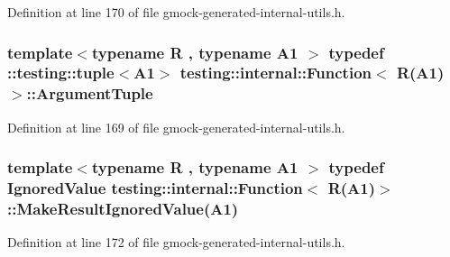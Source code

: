 Definition at line 170 of file gmock-\/generated-\/internal-\/utils.\+h.

\subsubsection[{\texorpdfstring{Argument\+Tuple}{ArgumentTuple}}]{\setlength{\rightskip}{0pt plus 5cm}template$<$typename R , typename A1 $>$ typedef \+::testing\+::tuple$<$A1$>$ {\bf testing\+::internal\+::\+Function}$<$ {\bf R}(A1)$>$\+::{\bf Argument\+Tuple}}\hypertarget{structtesting_1_1internal_1_1_function_3_01_r_07_a1_08_4_afd48881a58d72658e547a170fb0f2087}{}\label{structtesting_1_1internal_1_1_function_3_01_r_07_a1_08_4_afd48881a58d72658e547a170fb0f2087}


Definition at line 169 of file gmock-\/generated-\/internal-\/utils.\+h.

\subsubsection[{\texorpdfstring{Make\+Result\+Ignored\+Value}{MakeResultIgnoredValue}}]{\setlength{\rightskip}{0pt plus 5cm}template$<$typename R , typename A1 $>$ typedef {\bf Ignored\+Value} {\bf testing\+::internal\+::\+Function}$<$ {\bf R}(A1)$>$\+::Make\+Result\+Ignored\+Value(A1)}\hypertarget{structtesting_1_1internal_1_1_function_3_01_r_07_a1_08_4_a8fa56b9e05cb029ec7c8415ee352f865}{}\label{structtesting_1_1internal_1_1_function_3_01_r_07_a1_08_4_a8fa56b9e05cb029ec7c8415ee352f865}


Definition at line 172 of file gmock-\/generated-\/internal-\/utils.\+h.

